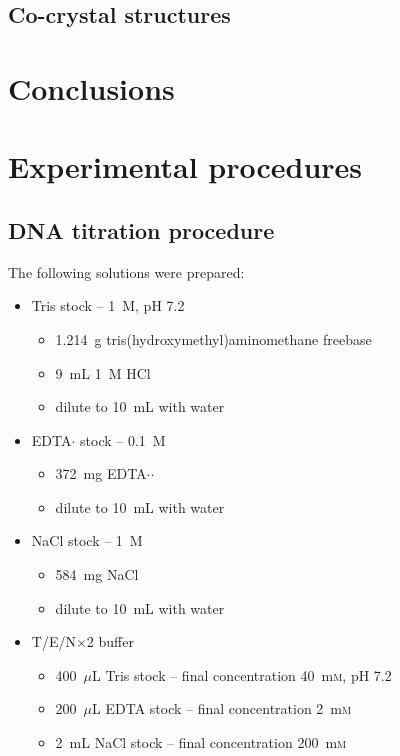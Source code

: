 \begin{refsection}
\subsection{Co-crystal structures}

\section{Conclusions}

\section{Experimental procedures}

\subsection{DNA titration procedure}
The following solutions were prepared:
\begin{itemize}
    \item Tris stock -- 1~\textsc{M}, pH 7.2
    \begin{itemize}
        \item 1.214~g tris(hydroxymethyl)aminomethane freebase
        \item 9~mL 1~\textsc{M} HCl
        \item dilute to 10~mL with water
    \end{itemize}
    \item EDTA$\cdot$ stock -- 0.1~\textsc{M}
    \begin{itemize}
        \item 372~mg EDTA$\cdot$$\cdot$
        \item dilute to 10~mL with water
    \end{itemize}
    \item NaCl stock -- 1~\textsc{M}
    \begin{itemize}
        \item 584~mg NaCl
        \item dilute to 10~mL with water
    \end{itemize}
    \item T/E/N$\times$2 buffer
    \begin{itemize}
        \item 400~$\mu$L Tris stock -- final concentration 40~m\textsc{m}, pH 7.2
        \item 200~$\mu$L EDTA stock -- final concentration 2~m\textsc{m}
        \item 2~mL NaCl stock -- final concentration 200~m\textsc{m}

\end{itemize}
\end{itemize}
\end{refsection}
